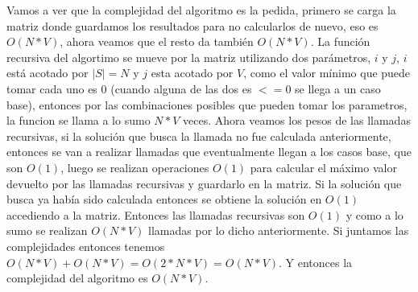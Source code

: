 \documentclass[a4paper]{article}
\begin{document}
%
%
%
%
%

Vamos a ver que la complejidad del algoritmo es la pedida, primero se carga la matriz donde guardamos los resultados para no calcularlos de nuevo, eso es $O(N*V)$, ahora veamos que el resto da también $O(N*V)$.
La función recursiva del algortimo se mueve por la matriz utilizando dos parámetros, $i$ y $j$, $i$ está acotado por $|S| = N$ y $j$ esta acotado por $V$, como el valor mínimo que puede tomar cada uno es 0 (cuando alguna de las dos es $<= 0$ se llega a un caso base), entonces por las combinaciones posibles que pueden tomar los parametros, la funcion se llama a lo sumo $N*V$ veces. Ahora veamos los pesos de las llamadas recursivas, si la solución que busca la llamada no fue calculada anteriormente, 	entonces se van a realizar llamadas que eventualmente llegan a los casos base, que son $O(1)$, luego se realizan operaciones $O(1)$ para calcular el máximo valor devuelto por las llamadas recursivas y guardarlo en la matriz. Si la solución que busca ya había sido calculada entonces se obtiene la solución en $O(1)$ accediendo a la matriz. Entonces las llamadas recursivas son $O(1)$ y como a lo sumo se realizan $O(N*V)$ llamadas por lo dicho anteriormente.
Si juntamos las complejidades entonces tenemos $O(N*V) + O(N*V) = O(2*N*V) = O(N*V)$. Y entonces la complejidad del algoritmo es $O(N*V)$.
\end{document}
